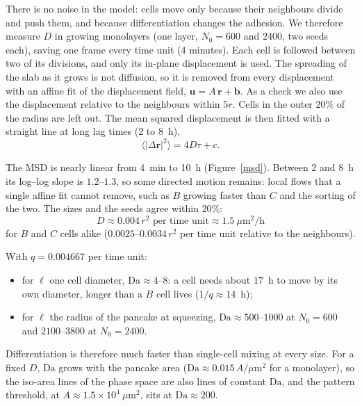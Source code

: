 \documentclass{article}
\begin{document}
    There is no noise in the model: cells move only because their neighbours divide and push them, and because differentiation changes the adhesion. We therefore measure $D$ in growing monolayers (one layer, $N_0 = 600$ and $2400$, two seeds each), saving one frame every time unit (4 minutes). Each cell is followed between two of its divisions, and only its in-plane displacement is used. The spreading of the slab as it grows is not diffusion, so it is removed from every displacement with an affine fit of the displacement field, $\mathbf u = A\,\mathbf r + \mathbf b$. As a check we also use the displacement relative to the neighbours within $5r$. Cells in the outer $20\%$ of the radius are left out. The mean squared displacement is then fitted with a straight line at long lag times (2 to 8~h),
    \begin{equation*}
        \langle |\Delta \mathbf r|^2 \rangle = 4 D \tau + c .
    \end{equation*}

    The MSD is nearly linear from 4~min to 10~h (Figure~\ref{msd}). Between 2 and 8~h its log--log slope is $1.2$--$1.3$, so some directed motion remains: local flows that a single affine fit cannot remove, such as $B$ growing faster than $C$ and the sorting of the two. The sizes and the seeds agree within $20\%$:
    \begin{equation*}
        D \approx 0.004\, r^2 \text{ per time unit} \approx 1.5~\mu\mathrm{m}^2/\mathrm{h}
    \end{equation*}
    for $B$ and $C$ cells alike ($0.0025$--$0.0034\, r^2$ per time unit relative to the neighbours).

    With $q = 0.004667$ per time unit:
    \begin{itemize}
        \item for $\ell$ one cell diameter, $\mathrm{Da} \approx 4$--$8$: a cell needs about $17$~h to move by its own diameter, longer than a $B$ cell lives ($1/q \approx 14$~h);
        \item for $\ell$ the radius of the pancake at squeezing, $\mathrm{Da} \approx 500$--$1000$ at $N_0=600$ and $2100$--$3800$ at $N_0=2400$.
    \end{itemize}
    Differentiation is therefore much faster than single-cell mixing at every size. For a fixed $D$, $\mathrm{Da}$ grows with the pancake area ($\mathrm{Da}\approx 0.015\,A/\mu\mathrm{m}^2$ for a monolayer), so the iso-area lines of the phase space are also lines of constant $\mathrm{Da}$, and the pattern threshold, at $A \approx 1.5\times10^4~\mu\mathrm{m}^2$, sits at $\mathrm{Da}\approx 200$.
\end{document}
